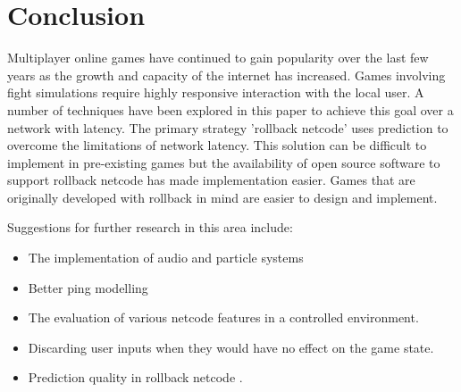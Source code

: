 \documentclass{entcs}
\begin{document}
\section{Conclusion}

Multiplayer online games have continued to gain popularity over the last few years as the growth and capacity of the internet has increased. Games involving fight simulations require highly responsive interaction with the local user. A number of techniques have been explored in this paper to achieve this goal over a network with latency. The primary strategy 'rollback netcode' uses prediction to overcome the limitations of network latency. This solution can be difficult to implement in pre-existing games but the availability of open source software to support rollback netcode has made implementation easier. Games that are originally developed with rollback in mind are easier to design and implement.

Suggestions for further research in this area include:
\begin{itemize}
\item The implementation of audio and particle systems
\item Better ping modelling
\item The evaluation of various netcode features in a controlled environment.
\item Discarding user inputs when they would have no effect on the game state. 
\item Prediction quality in rollback netcode \cite {neuralPred}.
\end{itemize}
\end{document}

